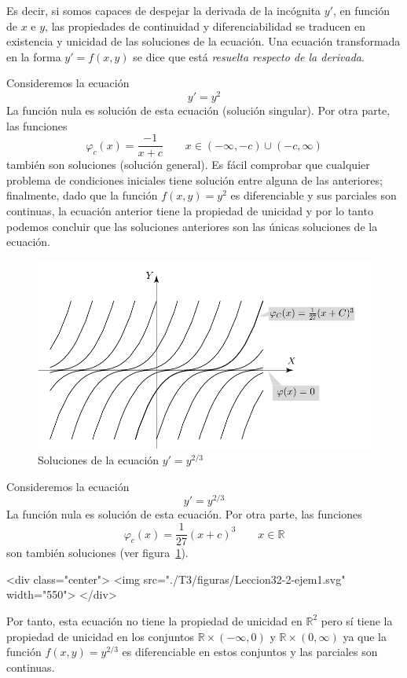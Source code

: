 Es decir, si somos capaces de despejar la derivada de la incógnita $y'$, en función de $x$ e $y$, las propiedades de continuidad y diferenciabilidad se traducen en existencia y unicidad de las soluciones de la ecuación.
Una ecuación transformada en la forma $y'=f(x,y)$ se dice que está \emph{resuelta respecto de la derivada}.

\newpage
\begin{ejemplo}
Consideremos la ecuación
$$ y'=y^2 $$
La función nula es solución de esta ecuación  (solución singular). Por otra parte, las funciones
$$
\varphi_c(x)=\dfrac{-1}{x+c}\qquad  x\in (-\infty,-c)\cup (-c,\infty)
$$
también son soluciones (solución general).
Es fácil comprobar que cualquier problema de condiciones iniciales tiene solución entre alguna de las anteriores; finalmente, dado que la función $f(x,y)=y^2$ es diferenciable y sus parciales son continuas, la ecuación anterior tiene la propiedad de unicidad y por lo tanto podemos concluir que las soluciones anteriores son las únicas soluciones de la ecuación.
\fej\end{ejemplo}

\begin{latexonly}
\begin{figure}
\begin{center}
\includegraphics[width=.8\textwidth]{T3/figs/ejem1.pdf}
\end{center}
\caption{Soluciones de la ecuación $
y'=y^{2/3}
$}\label{ej1}
\end{figure}
\end{latexonly}
\begin{ejemplo}
Consideremos la ecuación
$$
y'=y^{2/3}
$$
La función nula es solución de esta ecuación. Por otra parte, las funciones
$$
\varphi_c(x)=\dfrac{1}{27}(x+c)^3\qquad  x\in \mathbb{R}
$$
son también soluciones (ver figura~\ref{ej1}).
\begin{rawhtml}
<div class="center">
<img src="./T3/figuras/Leccion32-2-ejem1.svg" width="550">
</div>
\end{rawhtml}
Por tanto, esta ecuación no tiene la
propiedad de unicidad en
$\mathbb{R}^2$ pero sí tiene la propiedad de unicidad en los conjuntos $\mathbb{R}\times
(-\infty,0)$ y
$\mathbb{R}\times (0,\infty)$ ya que la función $f(x,y)=y^{2/3}$ es diferenciable en
estos conjuntos y las parciales son continuas.
\fej\end{ejemplo}

